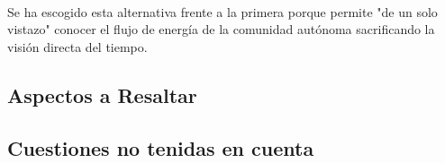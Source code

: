 \documentclass{article}
\begin{document}
			\paragraph{}
			Se ha escogido esta alternativa frente a la primera porque permite "de un solo vistazo" conocer el flujo de energía de la comunidad autónoma sacrificando la visión directa del tiempo.



		\subsection{Aspectos a Resaltar}


		\subsection{Cuestiones no tenidas en cuenta}
\end{document}
